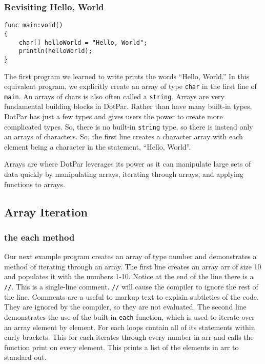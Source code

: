 \documentclass{article}
\begin{document}
\subsubsection{Revisiting Hello, World}

\begin{verbatim}
func main:void()
{
    char[] helloWorld = "Hello, World";
    println(helloWorld);
}
\end{verbatim}

The first program we learned to write prints the words ``Hello, World.''  In this equivalent program, we explicitly create an array of type \verb=char= in the first line of \verb=main=. An arrays of chars is also often called a \verb=string=. Arrays are very fundamental building blocks in DotPar. Rather than have many built-in types, DotPar has just a few types and gives users the power to create more complicated types. So, there is no built-in \verb=string= type, so there is instead only an arrays of characters. So, the first line creates a character array with each element being a character in the statement, ``Hello, World''.

Arrays are where DotPar leverages its power as it can manipulate large sets of data quickly by manipulating arrays, iterating through arrays, and applying functions to arrays. 

\subsection{Array Iteration}
\subsubsection{the each method}
Our next example program creates an array of type number and demonstrates a method of iterating through an array. The first line creates an array arr of size 10 and populates it with the numbers 1-10. Notice at the end of the line there is a \verb=//=. This is a single-line comment. \verb=//= will cause the compiler to ignore the rest of the line. Comments are a useful to markup text to explain subtleties of the code. They are ignored by the compiler, so they are not evaluated. The second line demonstrates the use of the built-in \verb=each= function, which is used to iterate over an array element by element. For each loops contain all of its statements within curly brackets.  This for each iterates through every number in arr and calls the function print on every element. This prints a list of the elements in arr to standard out.
\end{document}
